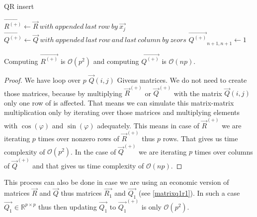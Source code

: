 \begin{algorithm}[H]
    \label{addingrowqr}

      \caption{QR insert}
      $\vec{R^{(+)}} \gets \vec{R}~with~appended~last~row~by~\vec{x_j}$\;
      $\vec{Q^{(+)}} \gets \vec{Q}~with~appended~last~row~and~last~column~by~zeors$\;
      $\vec{Q^{(+)}}_{n+1, n+1} \gets 1$ 


      

    \;
\end{algorithm}


\begin{observation} \label{qrinserttime}
Computing $\vec{R^{(+)}}$ is $\mathcal{O}(p^2)$ and computing $\vec{Q^{(+)}}$ is $\mathcal{O}(np)$.
\end{observation}

\begin{proof} \label{qrinsertproof}
We have loop over $p$ $\vec{Q}(i,j)$ Givens matrices. We do not need to create those matrices, because by multiplying $\vec{R}^{(+)}$ or $\vec{Q}^{(+)}$ with the matrix $\vec{Q}(i,j)$ only one row of is affected. That means we can simulate this matrix-matrix multiplication only by iterating over those matrices and multiplying elements with $\cos(\varphi)$ and $\sin(\varphi)$ adequately. This means in case of $\vec{R}^{(+)}$ we are iterating $p$ times over nonzero rows of $\vec{R}^{(+)}$ thus $p$ rows. That gives us time complexity of $\mathcal{O}(p^2)$. In the case of $\vec{Q}^{(+)}$  we are iterating $p$ times over columns of $\vec{Q}^{(+)}$ and that gives us time complexity of $\mathcal{O}(np)$.
\end{proof}

\begin{note}
This process can also be done in case we are using an economic version of matrices $\vec{R}$ and $\vec{Q}$  thus matrices $\vec{R_1}$ and $\vec{Q_1}$ (see \eqref{matrixq1r1}). In such a case
$\vec{Q_1} \in \mathbb{R}^{p \times p}$ thus then updating $\vec{Q_1}$ to $\vec{Q_1}^{(+)}$ is only $\mathcal{O}(p^2)$.
\end{note}


